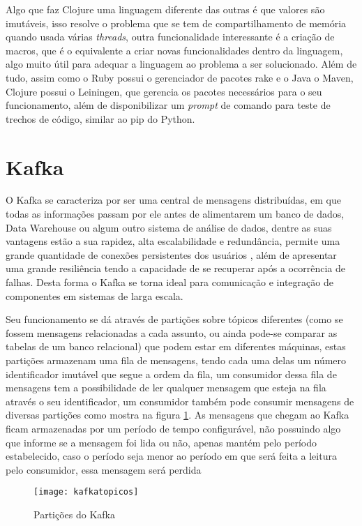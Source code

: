 Algo que faz Clojure uma linguagem diferente das outras é que valores são imutáveis, isso resolve o problema que se tem de compartilhamento de memória quando usada várias \textit{threads}, outra funcionalidade interessante é a criação de macros, que é o equivalente a criar novas funcionalidades dentro da linguagem, algo muito útil para adequar a linguagem ao problema a ser solucionado. Além de tudo, assim como o Ruby possui o gerenciador de pacotes rake e o Java o Maven, Clojure possui o Leiningen, que gerencia os pacotes necessários para o seu funcionamento, além de disponibilizar um \textit{prompt} de comando para teste de trechos de código, similar ao pip do Python.~\cite{hickey2010clojure}

\section{Kafka}
O Kafka se caracteriza por ser uma central de mensagens distribuídas, em que todas as informações passam por ele antes de alimentarem um banco de dados, Data Warehouse ou algum outro sistema de análise de dados, dentre as suas vantagens estão a sua rapidez, alta escalabilidade e redundância, permite uma grande quantidade de conexões persistentes dos usuários , além de apresentar uma grande resiliência tendo a capacidade de se recuperar após a ocorrência de falhas. Desta forma o Kafka se torna ideal para comunicação e integração de componentes em sistemas de larga escala.

Seu funcionamento se dá através de partições sobre tópicos diferentes (como se fossem mensagens relacionadas a cada assunto, ou ainda pode-se comparar as tabelas de um banco relacional) que podem estar em diferentes máquinas, estas partições armazenam uma fila de mensagens, tendo cada uma delas um número identificador imutável que segue a ordem da fila, um consumidor dessa fila de mensagens tem a possibilidade de ler qualquer mensagem que esteja na fila através o seu identificador, um consumidor também pode consumir mensagens de diversas partições como mostra na figura \ref{fig:kafkatopicos}. As mensagens que chegam ao Kafka ficam armazenadas por um período de tempo configurável, não possuindo algo que informe se a mensagem foi lida ou não, apenas mantém pelo período estabelecido, caso o período seja menor ao período em que será feita a leitura pelo consumidor, essa mensagem será perdida

\begin{figure}[!h]
\caption{\label{fig:kafkatopicos} Partições do Kafka}
\begin{center}
\texttt{[image: kafkatopicos]}
\end{center}
\end{figure}

